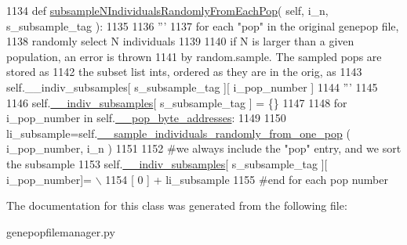 \begin{DoxyCode}
1134     \textcolor{keyword}{def }\hyperlink{classnegui_1_1genepopfilemanager_1_1GenepopFileManager_affaeb9457d84736dc1f289d600808f56}{subsampleNIndividualsRandomlyFromEachPop}( self, i\_n, 
      s\_subsample\_tag ):
1135 
1136         \textcolor{stringliteral}{'''}
1137 \textcolor{stringliteral}{        for each "pop" in the original genepop file,}
1138 \textcolor{stringliteral}{        randomly select N individuals}
1139 \textcolor{stringliteral}{        }
1140 \textcolor{stringliteral}{        if N is larger than a given population, an error is thrown}
1141 \textcolor{stringliteral}{        by random.sample.  The sampled pops are stored as }
1142 \textcolor{stringliteral}{        the subset list ints, ordered as they are in the orig, as       }
1143 \textcolor{stringliteral}{        self.\_\_indiv\_subsamples[ s\_subsample\_tag ][ i\_pop\_number ]}
1144 \textcolor{stringliteral}{        '''}
1145 
1146         self.\hyperlink{classnegui_1_1genepopfilemanager_1_1GenepopFileManager_a1e8379bcee4902ca9314ff53fcb71644}{\_\_indiv\_subsamples}[ s\_subsample\_tag ] = \{\}
1147 
1148         \textcolor{keywordflow}{for} i\_pop\_number \textcolor{keywordflow}{in} self.\hyperlink{classnegui_1_1genepopfilemanager_1_1GenepopFileManager_ae24c2bdd19136a345bdb42fd49c5d91f}{\_\_pop\_byte\_addresses}:
1149             
1150             li\_subsample=self.\hyperlink{classnegui_1_1genepopfilemanager_1_1GenepopFileManager_a9818467c9cb40f8e1de0c6cc7f52e263}{\_\_sample\_individuals\_randomly\_from\_one\_pop}
      ( i\_pop\_number, i\_n )
1151 
1152             \textcolor{comment}{#we always include the "pop" entry, and we sort the subsample}
1153             self.\hyperlink{classnegui_1_1genepopfilemanager_1_1GenepopFileManager_a1e8379bcee4902ca9314ff53fcb71644}{\_\_indiv\_subsamples}[ s\_subsample\_tag ][ i\_pop\_number]= \(\backslash\)
1154                      [ 0 ] +  li\_subsample
1155         \textcolor{comment}{#end for each pop number}
\end{DoxyCode}


The documentation for this class was generated from the following file\+:\begin{DoxyCompactItemize}
\item 
genepopfilemanager.\+py\end{DoxyCompactItemize}
